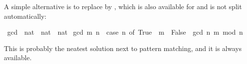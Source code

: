\begin{isabellebody}
\begin{isamarkuptext}
A simple alternative is to replace  by , 
which is also available for  and is not split automatically:%
\end{isamarkuptext}%
\isamarkuptrue%
\isamarkupfalse%
\ gcd{}\ {}{}\ {}nat\ {}\ nat\ {}\ nat{}\ \isanewline
{}gcd{}\ m\ n\ {}\ {}case\ n{}{}\ of\ True\ {}\ m\ {}\ False\ {}\ gcd{}\ n\ {}m\ mod\ n{}{}{}%
\begin{isamarkuptext}%
\noindent
This is probably the neatest solution next to pattern matching, and it is
always available.


\end{isamarkuptext}
\end{isabellebody}
